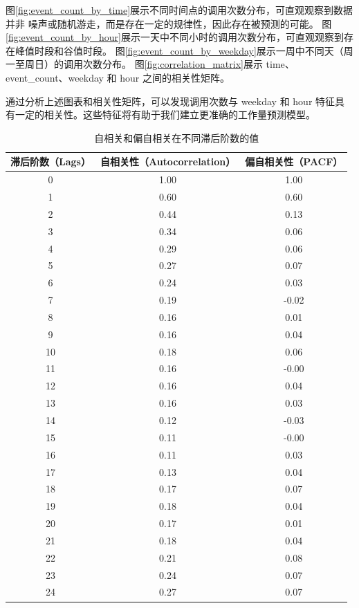 \documentclass[a4paper,AutoFakeBold,oneside,12pt]{book}
\begin{document}
	图\ref{fig:event_count_by_time}展示不同时间点的调用次数分布，可直观观察到数据并非
	噪声或随机游走，而是存在一定的规律性，因此存在被预测的可能。
	图\ref{fig:event_count_by_hour}展示一天中不同小时的调用次数分布，可直观观察到存在峰值时段和谷值时段。
	图\ref{fig:event_count_by_weekday}展示一周中不同天（周一至周日）的调用次数分布。
	图\ref{fig:correlation_matrix}展示 time、event\_count、weekday 和 hour 之间的相关性矩阵。

通过分析上述图表和相关性矩阵，可以发现调用次数与 weekday 和 hour 特征具有一定的相关性。这些特征将有助于我们建立更准确的工作量预测模型。

\begin{table}[tbp]
	\centering
	\caption{自相关和偏自相关在不同滞后阶数的值}
	\label{table:autocorrelation}
	\begin{tabular}{c|c|c}
	\hline
	\textbf{滞后阶数（Lags）} & \textbf{自相关性（Autocorrelation）} & \textbf{偏自相关性（PACF）} \\
	\hline
	0  & 1.00 & 1.00 \\
	1  & 0.60 & 0.60 \\
	2  & 0.44 & 0.13 \\
	3  & 0.34 & 0.06 \\
	4  & 0.29 & 0.06 \\
	5  & 0.27 & 0.07 \\
	6  & 0.24 & 0.03 \\
	7  & 0.19 & -0.02 \\
	8  & 0.16 & 0.01 \\
	9  & 0.16 & 0.04 \\
	10 & 0.18 & 0.06 \\
	11 & 0.16 & -0.00 \\
	12 & 0.16 & 0.04 \\
	13 & 0.16 & 0.03 \\
	14 & 0.12 & -0.03 \\
	15 & 0.11 & -0.00 \\
	16 & 0.11 & 0.03 \\
	17 & 0.13 & 0.04 \\
	18 & 0.17 & 0.07 \\
	19 & 0.18 & 0.04 \\
	20 & 0.17 & 0.01 \\
	21 & 0.18 & 0.04 \\
	22 & 0.21 & 0.08 \\
	23 & 0.24 & 0.07 \\
	24 & 0.27 & 0.07 \\
	\hline
	\end{tabular}
	\end{table}
	
\end{document}
